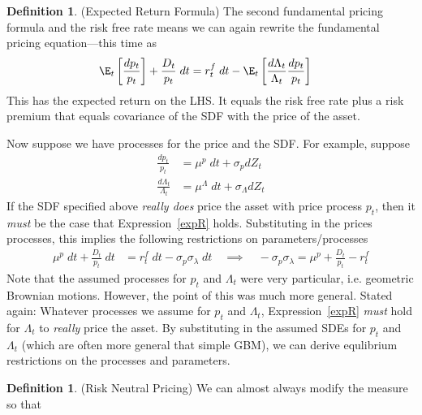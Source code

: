 \documentclass[12pt]{article}
\theoremstyle{plain}
\theoremstyle{definition}
\newtheorem{defn}[thm]{Definition}
\theoremstyle{remark}
\begin{document}
\begin{defn}(Expected Return Formula)
The second fundamental pricing formula and the risk free rate means we
can again rewrite the fundamental pricing equation---this time as
\begin{align}
  \E_t\left[
    \frac{dp_t}{p_t}
  \right]
  +
  \frac{D_t}{p_t}\;dt
  &=
  r_t^f\;dt
  -
  \E_t\left[
    \frac{d\Lambda_t}{\Lambda_t}
    \frac{dp_t}{p_t}
  \right]
  \label{expR}
\end{align}
This has the expected return on the LHS.
It equals the risk free rate plus a risk premium that equals covariance
of the SDF with the price of the asset.

Now suppose we have processes for the price and the SDF.
For example, suppose
\begin{align*}
  \frac{dp_t}{p_t}
  &= \mu^p \;dt + \sigma_p dZ_t \\
  \frac{d\Lambda_t}{\Lambda_t}
  &= \mu^\Lambda \;dt + \sigma_\Lambda dZ_t
\end{align*}
If the SDF specified above \emph{really does} price the asset with price
process $p_t$, then it \emph{must} be the case that
Expression~\ref{expR} holds.
Substituting in the prices processes, this implies the following
restrictions on parameters/processes
\begin{align*}
  \mu^p\;dt
  +
  \frac{D_t}{p_t}\;dt
  &=
  r_t^f\;dt
  -
  \sigma_p\sigma_\lambda\;dt
  \quad\implies\quad
  -\sigma_p\sigma_\lambda
  =
  \mu^p
  +
  \frac{D_t}{p_t}
  - r_t^f
\end{align*}
Note that the assumed processes for $p_t$ and $\Lambda_t$ were very
particular, i.e. geometric Brownian motions.
However, the point of this was much more general.
Stated again: Whatever processes we assume for $p_t$ and $\Lambda_t$,
Expression~\ref{expR} \emph{must} hold for $\Lambda_t$ to \emph{really}
price the asset. By substituting in the assumed SDEs for $p_t$ and
$\Lambda_t$ (which are often more general that simple GBM), we can
derive equlibrium restrictions on the processes and parameters.
\end{defn}

\begin{defn}(Risk Neutral Pricing)
We can almost always modify the measure so that
\end{defn}
\end{document}
